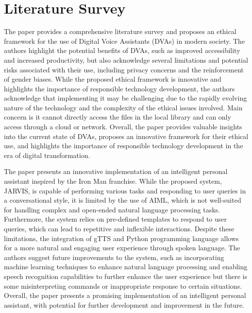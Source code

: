 \documentclass[conference]{IEEEtran}
\begin{document}
\section{Literature Survey}
The paper \cite{christensen2020digital} provides a comprehensive literature survey and proposes an ethical framework for the use of Digital Voice Assistants (DVAs) in modern society. The authors highlight the potential benefits of DVAs, such as improved accessibility and increased productivity, but also acknowledge several limitations and potential risks associated with their use, including privacy concerns and the reinforcement of gender biases. While the proposed ethical framework is innovative and highlights the importance of responsible technology development, the authors acknowledge that implementing it may be challenging due to the rapidly evolving nature of the technology and the complexity of the ethical issues involved. Main concern is it cannot directly access the files in the local library and can only access through a cloud or network. Overall, the paper provides valuable insights into the current state of DVAs, proposes an innovative framework for their ethical use, and highlights the importance of responsible technology development in the era of digital transformation.

\par The paper \cite{sangpal2019jarvis} presents an innovative implementation of an intelligent personal assistant inspired by the Iron Man franchise. While the proposed system, JARVIS, is capable of performing various tasks and responding to user queries in a conversational style, it is limited by the use of AIML, which is not well-suited for handling complex and open-ended natural language processing tasks. Furthermore, the system relies on pre-defined templates to respond to user queries, which can lead to repetitive and inflexible interactions. Despite these limitations, the integration of gTTS and Python programming language allows for a more natural and engaging user experience through spoken language. The authors suggest future improvements to the system, such as incorporating machine learning techniques to enhance natural language processing and enabling speech recognition capabilities to further enhance the user experience but there is some misinterpreting commands or inappropriate response to certain situations. Overall, the paper presents a promising implementation of an intelligent personal assistant, with potential for further development and improvement in the future.
\end{document}
